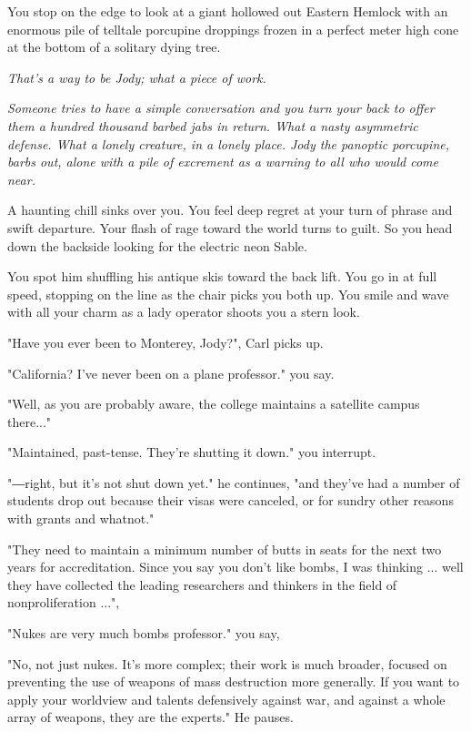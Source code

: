 \documentclass[a5paper, symmetric]{tufte-book}
\begin{document}
You stop on the edge to look at a giant hollowed out Eastern Hemlock with an enormous pile of telltale porcupine droppings frozen in a perfect meter high cone at the bottom of a solitary dying tree. 

\textit{That's a way to be Jody; what a piece of work.}

\textit{Someone tries to have a simple conversation and you turn your back to offer them a hundred thousand barbed jabs in return. What a nasty asymmetric defense. What a lonely creature, in a lonely place. Jody the panoptic porcupine, barbs out, alone with a pile of excrement as a warning to all who would come near.}

A haunting chill sinks over you. You feel deep regret at your turn of phrase and swift departure. Your flash of rage toward the world turns to guilt. So you head down the backside looking for the electric neon Sable.

You spot him shuffling his antique skis toward the back lift. You go in at full speed, stopping on the line as the chair picks you both up. You smile and wave with all your charm as a lady operator shoots you a stern look.

"Have you ever been to Monterey, Jody?", Carl picks up. 

"California? I've never been on a plane professor." you say. 

"Well, as you are probably aware, the college maintains a satellite campus there..."  

"Maintained, past-tense. They're shutting it down." you interrupt. 

"―right, but it's not shut down yet." he continues, "and they've had a number of students drop out because their visas were canceled, or for sundry other reasons with grants and whatnot."

"They need to maintain a minimum number of butts in seats for the next two years for accreditation. Since you say you don't like bombs, I was thinking ... well they have collected the leading researchers and thinkers in the field of nonproliferation ...",

"Nukes are very much bombs professor." you say,

"No, not just nukes. It's more complex; their work is much broader, focused on preventing the use of weapons of mass destruction more generally. If you want to apply your worldview and talents defensively against war, and against a whole array of weapons, they are the experts." He pauses. 
\end{document}

